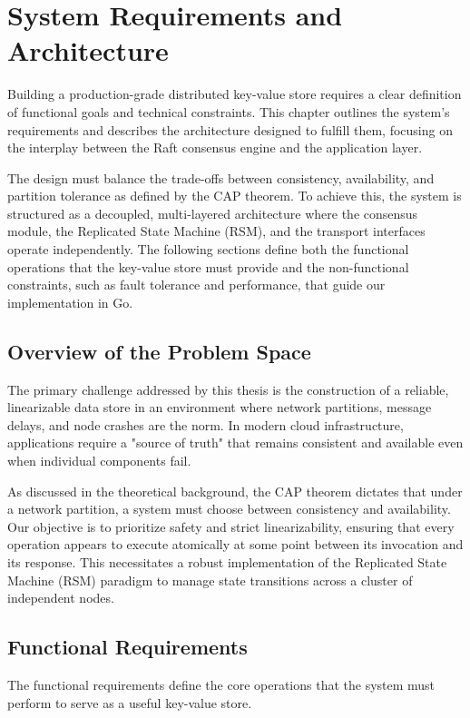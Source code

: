 \chapter{System Requirements and Architecture}
\label{ch:system_architecture}

Building a production-grade distributed key-value store requires a clear definition of functional goals and technical constraints. This chapter outlines the system’s requirements and describes the architecture designed to fulfill them, focusing on the interplay between the Raft consensus engine and the application layer.

The design must balance the trade-offs between consistency, availability, and partition tolerance as defined by the CAP theorem. To achieve this, the system is structured as a decoupled, multi-layered architecture where the consensus module, the Replicated State Machine (RSM), and the transport interfaces operate independently. The following sections define both the functional operations that the key-value store must provide and the non-functional constraints, such as fault tolerance and performance, that guide our implementation in Go.

\section{Overview of the Problem Space}
The primary challenge addressed by this thesis is the construction of a reliable, linearizable data store in an environment where network partitions, message delays, and node crashes are the norm. In modern cloud infrastructure, applications require a "source of truth" that remains consistent and available even when individual components fail.

As discussed in the theoretical background, the CAP theorem dictates that under a network partition, a system must choose between consistency and availability. Our objective is to prioritize safety and strict linearizability, ensuring that every operation appears to execute atomically at some point between its invocation and its response. This necessitates a robust implementation of the Replicated State Machine (RSM) paradigm to manage state transitions across a cluster of independent nodes.

\section{Functional Requirements}
The functional requirements define the core operations that the system must perform to serve as a useful key-value store.

